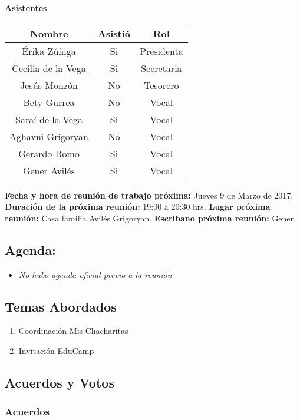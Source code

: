 \documentclass[]{book}
\providecommand{\tightlist}{%
  \setlength{\itemsep}{0pt}\setlength{\parskip}{0pt}}
\begin{document}
\textbf{Asistentes}

\begin{longtable}[]{@{}ccc@{}}
\toprule
Nombre & Asistió & Rol\tabularnewline
\midrule
\endhead
Érika Zúñiga & Si & Presidenta\tabularnewline
Cecilia de la Vega & Si & Secretaria\tabularnewline
Jesús Monzón & No & Tesorero\tabularnewline
Bety Gurrea & No & Vocal\tabularnewline
Saraí de la Vega & Si & Vocal\tabularnewline
Aghavni Grigoryan & No & Vocal\tabularnewline
Gerardo Romo & Si & Vocal\tabularnewline
Gener Avilés & Si & Vocal\tabularnewline
\bottomrule
\end{longtable}

 \textbf{Fecha y hora de reunión de trabajo próxima:} Jueves 9 de Marzo
de 2017. \textbf{Duración de la próxima reunión:} 19:00 a 20:30 hrs.
\textbf{Lugar próxima reunión:} Casa familia Avilés Grigoryan.
\textbf{Escribano próxima reunión:} Gener.

\subsection{Agenda:}\label{agenda-1}

\begin{itemize}
\tightlist
\item
  \emph{No hubo agenda oficial previo a la reunión}
\end{itemize}

\subsection{Temas Abordados}\label{temas-abordados-1}

\begin{enumerate}
\def\labelenumi{\arabic{enumi}.}
\tightlist
\item
  Coordinación Mis Chacharitas
\item
  Invitación EduCamp
\end{enumerate}

\subsection{Acuerdos y Votos}\label{acuerdos-y-votos-1}

\subsubsection{Acuerdos}\label{acuerdos-1}
\end{document}
